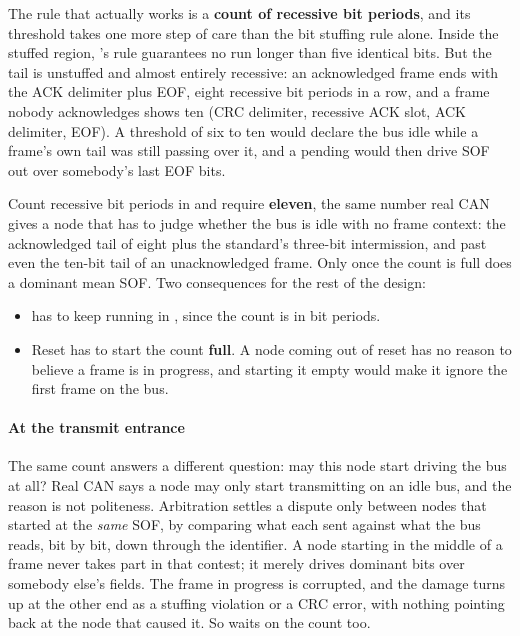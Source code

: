 The rule that actually works is a \textbf{count of recessive bit periods}, and its threshold takes
one more step of care than the bit stuffing rule alone. Inside the stuffed region,
's rule guarantees no run longer than five identical bits. But the tail is
unstuffed and almost entirely recessive: an acknowledged frame ends with the ACK delimiter plus EOF,
eight recessive bit periods in a row, and a frame nobody acknowledges shows ten (CRC delimiter,
recessive ACK slot, ACK delimiter, EOF). A threshold of six to ten would declare the bus idle while a
frame's own tail was still passing over it, and a pending  would then drive SOF out over
somebody's last EOF bits.

Count recessive bit periods in  and require \textbf{eleven}, the same number real
CAN gives a node that has to judge whether the bus is idle with no frame context: the acknowledged
tail of eight plus the standard's three-bit intermission, and past even the ten-bit tail of an
unacknowledged frame. Only once the count is full does a dominant  mean SOF. Two
consequences for the rest of the design:
\begin{itemize}
  \item {} has to keep running in , since the count is in bit periods.
  \item Reset has to start the count \textbf{full}. A node coming out of reset has no reason to
    believe a frame is in progress, and starting it empty would make it ignore the first frame on the
    bus.
\end{itemize}

\paragraph{At the transmit entrance}
The same count answers a different question: may this node start driving the bus at all? Real CAN
says a node may only start transmitting on an idle bus, and the reason is not politeness. Arbitration
settles a dispute only between nodes that started at the \emph{same} SOF, by comparing what each sent
against what the bus reads, bit by bit, down through the identifier. A node starting in the middle of
a frame never takes part in that contest; it merely drives dominant bits over somebody else's fields.
The frame in progress is corrupted, and the damage turns up at the other end as a stuffing violation
or a CRC error, with nothing pointing back at the node that caused it. So  waits on the
count too.


